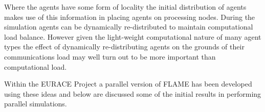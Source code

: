 Where the agents have some form of locality the initial distribution of agents makes use of this information in placing agents on processing nodes. During the simulation agents can be dynamically re-distributed to maintain computational load balance. However given the light-weight computational nature of many agent types the effect of dynamically re-distributing agents on the grounds of their communications load may well turn out to be more important than computational load.

Within the EURACE Project a parallel version of FLAME has been developed using these ideas and below are discussed some of the initial results in performing parallel simulations.

